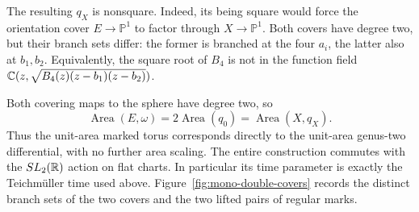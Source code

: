 The resulting $q_X$ is nonsquare.  Indeed, its being square would
force the orientation cover $E\to\mathbb P^1$ to factor through
$X\to\mathbb P^1$.  Both covers have degree two, but their branch
sets differ: the former is branched at the four $a_i$, the latter
also at $b_1,b_2$.
Equivalently, the square root of $B_4$ is not in the function field
$\mathbb C(z,\sqrt{B_4(z)(z-b_1)(z-b_2)})$.

Both covering maps to the sphere have degree two, so
\begin{equation}
 \operatorname{Area}(E,\omega)
 =2\operatorname{Area}(q_0)
 =\operatorname{Area}(X,q_X).
 \label{eq:genus2equalareas}
\end{equation}
Thus the unit-area marked torus corresponds directly to the
unit-area genus-two differential, with no further area scaling.
The entire construction commutes with the $SL_2(\mathbb R)$ action on
flat charts.  In particular its time parameter is exactly the
Teichm\"uller time used above.
Figure~\ref{fig:mono-double-covers} records the distinct branch sets
of the two covers and the two lifted pairs of regular marks.

